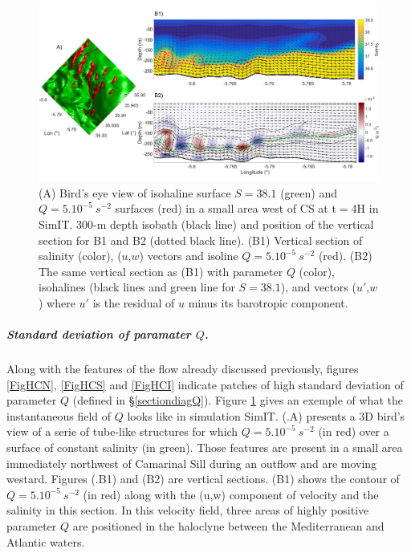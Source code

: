 \begin{figure}[!h]
 \includegraphics[width=\textwidth]{./GBR3D/FigInstaQ_IES4H.png}
 \caption [Exemple of primary shear instabilities in simIT.]{(A) Bird's eye view of isohaline surface $S=38.1$ (green) and $Q=5.10^{-5} \ s^{-2}$ surfaces (red) in a small area west of CS at t$=$4H in SimIT. 300-m depth isobath (black line) and position of the vertical section for B1 and B2 (dotted black line). (B1) Vertical section of salinity (color), ($u$,$w$) vectors and isoline $Q=5.10^{-5}\ s^{-2}$ (red). (B2) The same vertical section as (B1) with parameter $Q$ (color), isohalines (black lines and green line for $S=38.1$), and vectors ($u'$,$w$) where $u'$ is the residual of $u$ minus its barotropic component.}
 \label{FigInstaEx}
\end{figure}

\subparagraph{Standard deviation of paramater $Q$.}
Along with the features of the flow already discussed previously, figures \ref{FigHCN}, \ref{FigHCS} and \ref{FigHCI} indicate patches of high standard deviation of parameter $Q$ (defined in \S \ref{sectiondiagQ}). Figure \ref{FigInstaEx} gives an exemple of what the instantaneous field of $Q$ looks like in simulation SimIT. (.A) presents a 3D bird's view of a serie of tube-like structures for which $Q=5.10^{-5} \ s^{-2}$ (in red) over a surface of constant salinity (in green). Those features are present in a small area immediately northwest of Camarinal Sill during an outflow and are moving westard. Figures (.B1) and (B2) are vertical sections. (B1) shows the contour of $Q=5.10^{-5} \ s^{-2}$ (in red) along with the (u,w) component of velocity and the salinity in this section. In this velocity field, three areas of highly positive parameter $Q$ are positioned in the haloclyne between the Mediterranean and Atlantic waters.

